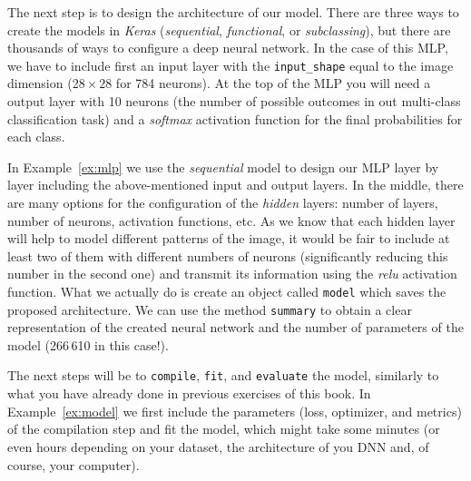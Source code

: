 
The next step is to design the architecture of our model. There are three ways to create the models in \emph{Keras} (\textit{sequential}, \textit{functional}, or \textit{subclassing}), but there are thousands of ways to configure a deep neural network. In the case of this MLP, we have to include first an input layer with the \texttt{input\_shape} equal to the image dimension ($28\times 28$ for 784 neurons). At the top of the MLP you will  need a output layer with 10 neurons (the number of possible outcomes in out multi-class classification task) and a \textit{softmax} activation function for the final probabilities for each class.

In Example~\ref{ex:mlp} we use the \textit{sequential} model to design our MLP layer by layer including the above-mentioned input and output layers. In the middle, there are many options for the configuration of the \textit{hidden} layers: number of layers, number of neurons, activation functions, etc. As we know that each hidden layer will help to model different patterns of the image, it would be fair to include at least two of them with different numbers of neurons (significantly reducing this number in the second one) and transmit its information using the \textit{relu} activation function. What we actually do is create an object called \texttt{model} which saves the proposed architecture. We can use the method \texttt{summary} to obtain a clear representation of the created neural network and the number of parameters of the model (266\,610 in this case!).


The next steps will be to \texttt{compile}, \texttt{fit}, and \texttt{evaluate} the model, similarly to what you have already done in previous exercises of this book. In Example~\ref{ex:model} we first include the parameters (loss, optimizer, and metrics) of the compilation step and fit the model, which might take some minutes (or even hours depending on your dataset, the architecture of you DNN and, of course, your computer).

